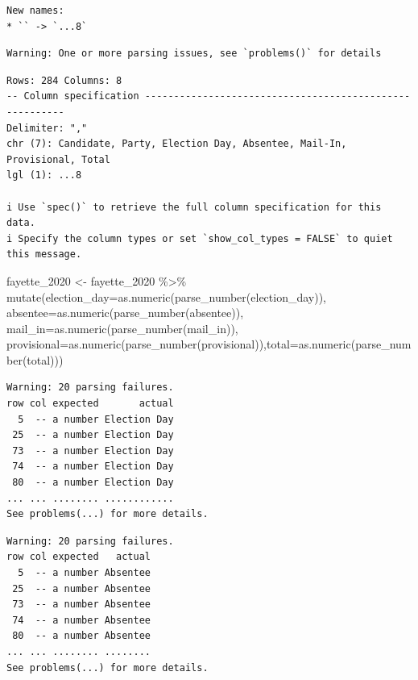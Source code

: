 \documentclass[
  letterpaper,
  DIV=11,
  numbers=noendperiod]{scrreprt}
\newenvironment{Shaded}{\begin{snugshade}}{\end{snugshade}}
\newcommand{\AttributeTok}[1]{\textcolor[rgb]{0.40,0.45,0.13}{#1}}
\newcommand{\FunctionTok}[1]{\textcolor[rgb]{0.28,0.35,0.67}{#1}}
\newcommand{\NormalTok}[1]{\textcolor[rgb]{0.00,0.23,0.31}{#1}}
\newcommand{\OtherTok}[1]{\textcolor[rgb]{0.00,0.23,0.31}{#1}}
\newcommand{\SpecialCharTok}[1]{\textcolor[rgb]{0.37,0.37,0.37}{#1}}
\begin{document}
\begin{verbatim}
New names:
* `` -> `...8`
\end{verbatim}

\begin{verbatim}
Warning: One or more parsing issues, see `problems()` for details
\end{verbatim}

\begin{verbatim}
Rows: 284 Columns: 8
-- Column specification --------------------------------------------------------
Delimiter: ","
chr (7): Candidate, Party, Election Day, Absentee, Mail-In, Provisional, Total
lgl (1): ...8

i Use `spec()` to retrieve the full column specification for this data.
i Specify the column types or set `show_col_types = FALSE` to quiet this message.
\end{verbatim}

\begin{Shaded}
\begin{Highlighting}[]
\NormalTok{fayette\_2020 }\OtherTok{\textless{}{-}}\NormalTok{ fayette\_2020 }\SpecialCharTok{\%\textgreater{}\%} \FunctionTok{mutate}\NormalTok{(}\AttributeTok{election\_day=}\FunctionTok{as.numeric}\NormalTok{(}\FunctionTok{parse\_number}\NormalTok{(election\_day)), }\AttributeTok{absentee=}\FunctionTok{as.numeric}\NormalTok{(}\FunctionTok{parse\_number}\NormalTok{(absentee)), }\AttributeTok{mail\_in=}\FunctionTok{as.numeric}\NormalTok{(}\FunctionTok{parse\_number}\NormalTok{(mail\_in)), }\AttributeTok{provisional=}\FunctionTok{as.numeric}\NormalTok{(}\FunctionTok{parse\_number}\NormalTok{(provisional)),}\AttributeTok{total=}\FunctionTok{as.numeric}\NormalTok{(}\FunctionTok{parse\_number}\NormalTok{(total)))}
\end{Highlighting}
\end{Shaded}

\begin{verbatim}
Warning: 20 parsing failures.
row col expected       actual
  5  -- a number Election Day
 25  -- a number Election Day
 73  -- a number Election Day
 74  -- a number Election Day
 80  -- a number Election Day
... ... ........ ............
See problems(...) for more details.
\end{verbatim}

\begin{verbatim}
Warning: 20 parsing failures.
row col expected   actual
  5  -- a number Absentee
 25  -- a number Absentee
 73  -- a number Absentee
 74  -- a number Absentee
 80  -- a number Absentee
... ... ........ ........
See problems(...) for more details.
\end{verbatim}
\end{document}
